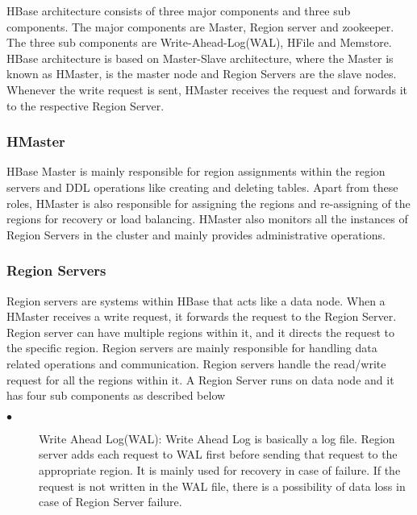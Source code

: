\documentclass[11pt,a4paper,bibtotoc,idxtotoc,headsepline,footsepline,footexclude,BCOR12mm,DIV13]{scrbook}
\begin{document}
HBase architecture consists of three major components and three sub components. The major components are Master, Region server and zookeeper. The three sub components are Write-Ahead-Log(WAL), HFile and Memstore\cite{hbase:insights}. HBase architecture is based on Master-Slave architecture, where the Master is known as HMaster, is the master node and Region Servers are the slave nodes. Whenever the write request is sent, HMaster receives the request and forwards it to the respective Region Server\cite{hbase:insights}. 

\subsubsection{HMaster}
\label{hmaster}

HBase Master is mainly responsible for region assignments within the region servers and DDL operations like creating and deleting tables\cite{hbase:architecture}. Apart from these roles, HMaster is also responsible for assigning the regions and re-assigning of the regions for recovery or load balancing\cite{hbase:architecture}. HMaster also monitors all the instances of Region Servers in the cluster\cite{hbase:architecture} and mainly provides administrative operations.

\subsubsection{Region Servers}
\label{region serves}

Region servers are systems within HBase that acts like a data node\cite{hbase:insights}. When a HMaster receives a write request, it forwards the request to the Region Server. Region server can have multiple regions within it, and it directs the request to the specific region. Region servers are mainly responsible for handling data related operations and communication. Region servers handle the read/write request for all the regions within it. 
A Region Server runs on data node and it has four sub components as described below\cite{hbase:architecture}
\begin{description}
	\item[$\bullet$]  Write Ahead Log(WAL): Write Ahead Log is basically a log file. Region server adds each request to WAL first before sending that request to the appropriate region. It is mainly used for recovery in case of failure\cite{hbase:insights}. If the request is not written in the WAL file, there is a possibility of data loss in case of Region Server failure.
\end{description}
\end{document}
